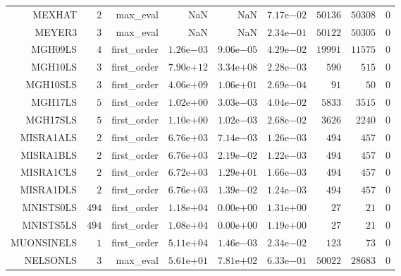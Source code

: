 \begin{longtable}{rrrrrrrrr}
MEXHAT & \(     2\) & max\_eval &       NaN &       NaN & \( 7.17\)e\(-02\) & \( 50136\) & \( 50308\) & \(     0\) \\
MEYER3 & \(     3\) & max\_eval &       NaN &       NaN & \( 2.34\)e\(-01\) & \( 50122\) & \( 50305\) & \(     0\) \\
MGH09LS & \(     4\) & first\_order & \( 1.26\)e\(-03\) & \( 9.06\)e\(-05\) & \( 4.29\)e\(-02\) & \( 19991\) & \( 11575\) & \(     0\) \\
MGH10LS & \(     3\) & first\_order & \( 7.90\)e\(+12\) & \( 3.34\)e\(+08\) & \( 2.28\)e\(-03\) & \(   590\) & \(   515\) & \(     0\) \\
MGH10SLS & \(     3\) & first\_order & \( 4.06\)e\(+09\) & \( 1.06\)e\(+01\) & \( 2.69\)e\(-04\) & \(    91\) & \(    50\) & \(     0\) \\
MGH17LS & \(     5\) & first\_order & \( 1.02\)e\(+00\) & \( 3.03\)e\(-03\) & \( 4.04\)e\(-02\) & \(  5833\) & \(  3515\) & \(     0\) \\
MGH17SLS & \(     5\) & first\_order & \( 1.10\)e\(+00\) & \( 1.02\)e\(-03\) & \( 2.68\)e\(-02\) & \(  3626\) & \(  2240\) & \(     0\) \\
MISRA1ALS & \(     2\) & first\_order & \( 6.76\)e\(+03\) & \( 7.14\)e\(-03\) & \( 1.26\)e\(-03\) & \(   494\) & \(   457\) & \(     0\) \\
MISRA1BLS & \(     2\) & first\_order & \( 6.76\)e\(+03\) & \( 2.19\)e\(-02\) & \( 1.22\)e\(-03\) & \(   494\) & \(   457\) & \(     0\) \\
MISRA1CLS & \(     2\) & first\_order & \( 6.72\)e\(+03\) & \( 1.29\)e\(+01\) & \( 1.66\)e\(-03\) & \(   494\) & \(   457\) & \(     0\) \\
MISRA1DLS & \(     2\) & first\_order & \( 6.76\)e\(+03\) & \( 1.39\)e\(-02\) & \( 1.24\)e\(-03\) & \(   494\) & \(   457\) & \(     0\) \\
MNISTS0LS & \(   494\) & first\_order & \( 1.18\)e\(+04\) & \( 0.00\)e\(+00\) & \( 1.31\)e\(+00\) & \(    27\) & \(    21\) & \(     0\) \\
MNISTS5LS & \(   494\) & first\_order & \( 1.08\)e\(+04\) & \( 0.00\)e\(+00\) & \( 1.19\)e\(+00\) & \(    27\) & \(    21\) & \(     0\) \\
MUONSINELS & \(     1\) & first\_order & \( 5.11\)e\(+04\) & \( 1.46\)e\(-03\) & \( 2.34\)e\(-02\) & \(   123\) & \(    73\) & \(     0\) \\
NELSONLS & \(     3\) & max\_eval & \( 5.61\)e\(+01\) & \( 7.81\)e\(+02\) & \( 6.33\)e\(-01\) & \( 50022\) & \( 28683\) & \(     0\) \\

\end{longtable}
